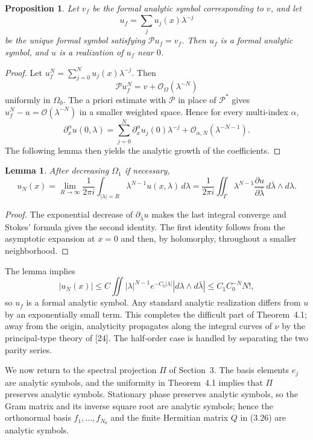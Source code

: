 \documentclass[11pt,a4paper]{article}
\newcommand{\cO}{\mathcal O}
\numberwithin{equation}{section}
\newtheorem{lemma}[theorem]{Lemma}
\newtheorem{proposition}[theorem]{Proposition}
\theoremstyle{remark}
\begin{document}
\begin{proposition}
Let $v_f$ be the formal analytic symbol corresponding to $v$, and let
\[
u_f=\sum_j u_j(x)\lambda^{-j}
\]
be the unique formal symbol satisfying $\mathcal P u_f=v_f$. Then $u_f$ is a formal analytic symbol, and $u$ is a realization of $u_f$ near $0$.
\end{proposition}
\begin{proof}
Let $u_f^N=\sum_{j=0}^N u_j(x)\lambda^{-j}$. Then
\[
\mathcal P u_f^N=v+\cO_\Omega(\lambda^{-N})
\]
uniformly in $\Omega_0$. The a priori estimate with $\mathcal P$ in place of $\mathcal P^*$ gives $u_f^N-u=\cO(\lambda^{-N})$ in a smaller weighted space. Hence for every multi-index $\alpha$,
\begin{equation}
\partial_x^\alpha u(0,\lambda)=
\sum_{j=0}^N\partial_x^\alpha u_j(0)\lambda^{-j}
+\cO_{\alpha,N}(\lambda^{-N-1}).
\end{equation}
The following lemma then yields the analytic growth of the coefficients.
\end{proof}

\begin{lemma}
After decreasing $\Omega_1$ if necessary,
\begin{equation}
u_N(x)=\lim_{R\to\infty}\frac1{2\pi i}
\int_{|\lambda|=R}\lambda^{N-1}u(x,\lambda)\,d\lambda
=\frac1{2\pi i}\iint_\Gamma
\lambda^{N-1}\frac{\partial u}{\partial\bar\lambda}
\,d\bar\lambda\wedge d\lambda.
\end{equation}
\end{lemma}
\begin{proof}
The exponential decrease of $\partial_{\bar\lambda}u$ makes the last integral converge and Stokes' formula gives the second identity. The first identity follows from the asymptotic expansion at $x=0$ and then, by holomorphy, throughout a smaller neighborhood.
\end{proof}
The lemma implies
\[
|u_N(x)|\le C\iint |\lambda|^{N-1}e^{-C_0|\lambda|}
|d\lambda\wedge d\bar\lambda|
\le C_1C_0^{-N}N!,
\]
so $u_f$ is a formal analytic symbol. Any standard analytic realization differs from $u$ by an exponentially small term. This completes the difficult part of Theorem~4.1; away from the origin, analyticity propagates along the integral curves of $\nu$ by the principal-type theory of [24]. The half-order case is handled by separating the two parity series.

We now return to the spectral projection $\Pi$ of Section~3. The basis elements $e_j$ are analytic symbols, and the uniformity in Theorem~4.1 implies that $\Pi$ preserves analytic symbols. Stationary phase preserves analytic symbols, so the Gram matrix and its inverse square root are analytic symbols; hence the orthonormal basis $f_1,\ldots,f_{N_0}$ and the finite Hermitian matrix $Q$ in (3.26) are analytic symbols.
\end{document}
